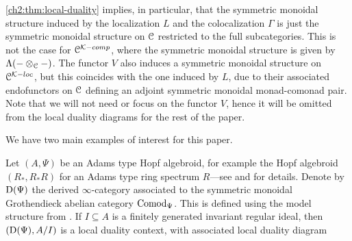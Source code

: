\begin{remark}
    \label{ch2:rm:monoidal-structure-in-local-duality}
    \cref{ch2:thm:local-duality} implies, in particular, that the symmetric monoidal structure induced by the localization $L$ and the colocalization $\Gamma$ is just the symmetric monoidal structure on $\EuScript{C}$ restricted to the full subcategories. This is not the case for $\EuScript{C}^{\mathcal{K}-comp}$, where the symmetric monoidal structure is given by $\Lambda(-\otimes_{\EuScript{C}}-)$. The functor $V$ also induces a symmetric monoidal structure on $\EuScript{C}^{\mathcal{K}-loc}$, but this coincides with the one induced by $L$, due to their associated endofunctors on $\EuScript{C}$ defining an adjoint symmetric monoidal monad-comonad pair. Note that we will not need or focus on the functor $V$, hence it will be omitted from the local duality diagrams for the rest of the paper. 
\end{remark}

We have two main examples of interest for this paper. 

\begin{example}
    \label{ch2:ex:local-duality-comod}
    Let $(A,\Psi)$ be an Adams type Hopf algebroid, for example the Hopf algebroid $(R_*, R_*R)$ for an Adams type ring spectrum $R$---see \cite[A.1]{ravenel_86} and \cite{hovey_04} for details. Denote by $\mathrm{D}(\Psi)$ the derived $\infty$-category associated to the symmetric monoidal Grothendieck abelian category $\mathrm{Comod}_\Psi$. This is defined using the model structure from \cite{barnes-roitzheim_2011}. If $I\subseteq A$ is a finitely generated invariant regular ideal, then $(\mathrm{D}(\Psi), A/I)$ is a local duality context, with associated local duality diagram
    \begin{center}
    \end{center}
\end{example}

